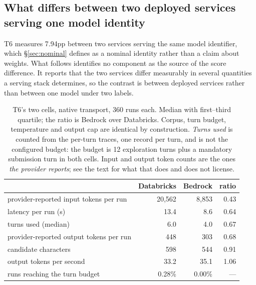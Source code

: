 \subsection{What differs between two deployed services serving one model identity}
\label{sec:runtime}

T6 measures 7.94pp between two services serving the same model identifier, which \S\ref{sec:nominal}
defines as a nominal identity rather than a claim about weights. What follows identifies no component as
the source of the score difference. It reports that the two services differ measurably in several
quantities a serving stack determines, so the contrast is between deployed services rather than between
one model under two labels.

\begin{table}[t]
\centering
\caption{T6's two cells, native transport, 360 runs each. Median with first--third quartile; the ratio is
Bedrock over Databricks. Corpus, turn budget, temperature and output cap are identical by construction.
\emph{Turns used} is counted from the per-turn traces, one record per turn, and is not the configured
budget: the budget is 12 exploration turns plus a mandatory submission turn in both cells. Input and output
token counts are the ones \emph{the provider reports}; see the text for what that does and does not
license.}
\label{tab:runtime}
\footnotesize
\setlength{\tabcolsep}{4pt}
\begin{tabular}{@{}lrrr@{}}
\toprule
& Databricks & Bedrock & ratio \\
\midrule
provider-reported input tokens per run & 20{,}562 & 8{,}853 & 0.43 \\
latency per run (s) & 13.4 & 8.6 & 0.64 \\
turns used (median) & 6.0 & 4.0 & 0.67 \\
provider-reported output tokens per run & 448 & 303 & 0.68 \\
candidate characters & 598 & 544 & 0.91 \\
output tokens per second & 33.2 & 35.1 & 1.06 \\
\midrule
runs reaching the turn budget & 0.28\% & 0.00\% & --- \\
\bottomrule
\end{tabular}
\end{table}

